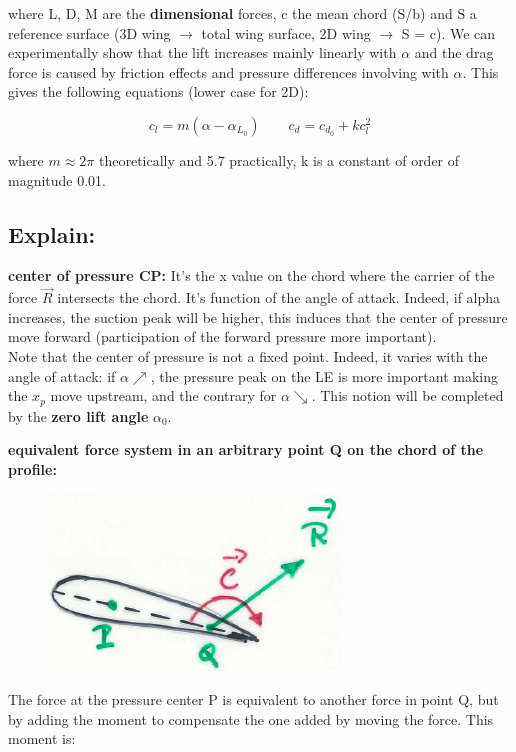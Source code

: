 \documentclass[british,french,11pt, a4paper, openany]{article}
\begin{document}
where L, D, M are the \textbf{dimensional} forces, c the mean chord (S/b) and S a reference surface (3D wing $\rightarrow$ total wing surface, 2D wing $\rightarrow$ S = c). We can experimentally show that the lift increases mainly linearly with $\alpha$ and the drag force is caused by friction effects and pressure differences involving with $\alpha$. This gives the following equations (lower case for 2D):

\begin{equation}
c_l = m(\alpha - \alpha _{L_0}) \qquad c_d = c_{d_0} + kc^2_l
\end{equation}

where $m\approx 2\pi$ theoretically and 5.7 practically, k is a constant of order of magnitude 0.01.

\subsection{Explain:}
\textbf{center of pressure CP:} It's the x value on the chord where the carrier of the force $\vec{R}$ intersects the chord. It's function of the angle of attack. Indeed, if alpha increases, the suction peak will be higher, this induces that the center of pressure move forward (participation of the forward pressure more important).\\

Note that the center of pressure is not a fixed point. Indeed, it varies with the angle of attack: if $\alpha \nearrow$, the pressure peak on the LE is more important making the $x_p$ move upstream, and the contrary for $\alpha \searrow$. This notion will be completed by the \textbf{zero lift angle} $\alpha _{0}$.

\textbf{equivalent force system in an arbitrary point Q on the chord of the profile:} 
\begin{figure}
	\vspace{-5mm}
	\includegraphics[scale=0.3]{ch2/11}
\end{figure}
The force at the pressure center P is equivalent to another force in point Q, but by adding the moment to compensate the one added by moving the force. This moment is:
\end{document}
